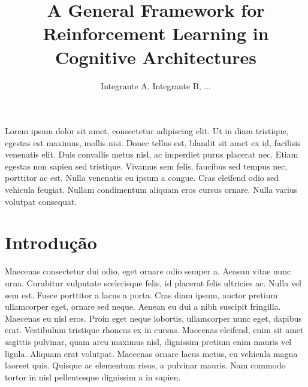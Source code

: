 \documentclass[12pt]{article}
\title{A General Framework for Reinforcement Learning in Cognitive Architectures}
\author{Integrante A\inst{1}, Integrante B\inst{1}, ...}
\begin{document}
 

\maketitle 

     
\begin{resumo} 
  Lorem ipsum dolor sit amet, consectetur adipiscing elit. Ut in diam tristique, egestas est maximus, mollis nisi. Donec tellus est, blandit sit amet ex id, facilisis venenatis elit. Duis convallis metus nisl, ac imperdiet purus placerat nec. Etiam egestas non sapien sed tristique. Vivamus sem felis, faucibus sed tempus nec, porttitor ac est. Nulla venenatis eu ipsum a congue. Cras eleifend odio sed vehicula feugiat. Nullam condimentum aliquam eros cursus ornare. Nulla varius volutpat consequat.
\end{resumo}

\section{Introdução}\label{sec:introd}
Maecenas consectetur dui odio, eget ornare odio semper a. Aenean vitae nunc urna. Curabitur vulputate scelerisque felis, id placerat felis ultricies ac. Nulla vel sem est. Fusce porttitor a lacus a porta. Cras diam ipsum, auctor pretium ullamcorper eget, ornare sed neque. Aenean eu dui a nibh suscipit fringilla. Maecenas eu nisl eros. Proin eget neque lobortis, ullamcorper nunc eget, dapibus erat. Vestibulum tristique rhoncus ex in cursus. Maecenas eleifend, enim sit amet sagittis pulvinar, quam arcu maximus nisl, dignissim pretium enim mauris vel ligula. Aliquam erat volutpat. Maecenas ornare lacus metus, eu vehicula magna laoreet quis. Quisque ac elementum risus, a pulvinar mauris. Nam commodo tortor in nisl pellentesque dignissim a in sapien. 
\end{document}
